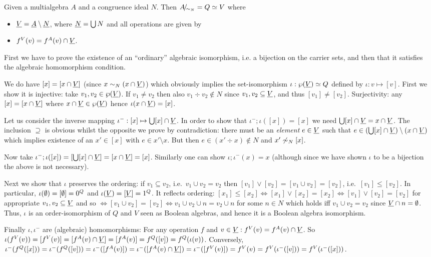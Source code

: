 \documentclass[10pt]{article}
\begin{document}
\begin{Fact}
Given a multialgebra $A$ and a congruence ideal $N$. 
Then $A\!{\textstyle /}\!_{{\sim_{N}}}=Q\mathrel{\simeq} V$ where 
%
\begin{itemize}\MyLPar
\item 
$\underline {V}=\underline {A}\setminus\underline {N}$, where $\underline {N}=\bigcup N$
and all operations are given by
\item 
$f^V(v)=f^A(v)\cap\underline {V}$.
\end{itemize}
\end{Fact}

\begin{Proof}
First we have to prove the existence of an ``ordinary''
algebraic isomorphism, i.e. a bijection on the carrier sets, and then that
it satisfies the algebraic homomorphism condition.

We do have $[x]=[x\cap\underline {V}]$ (since $x\sim_N (x\cap\underline {V})$)
which obviously implies the set-isomorphism $\iota: \wp(\underline {V})
\mathrel{\simeq} Q$ defined by $\iota:v\mapsto [v]$. First we show it is
injective: take $v_1,v_2\in\wp(\underline {V})$. If $v_1\not= v_2$ then
also $v_1\div v_2\not\in N$ since $v_1,v_2\subseteq\underline {V}$, and thus
$[v_1]\not=[v_2]$. Surjectivity: any $[x] = [x\cap \underline {V}]$ where
$x\cap\underline {V} \in \wp(\underline {V})$ hence $\iota(x\cap\underline {V}) = [x]$.

Let us consider the inverse mapping $\iota^- : [x] \mapsto \bigcup [x]
\cap \underline {V}$. In order to show that $\iota^-;\iota([x]) = [x]$ we
need $\bigcup [x]\cap\underline {V} = x\cap\underline {V}$. The inclusion $\supseteq$
 is obvious whilst the opposite we prove by contradiction: there
must be an {\em element\/} $e \in \underline {V}$ such that $e \in (\bigcup
[x]\cap\underline {V}) \setminus (x\cap\underline {V})$ which implies existence of an $x'
\in [x]$ with $e \in x'\setminus x$. But then $e \in (x'\div x) \not\in N$ and
$x' \not\sim_N [x]$. 

Now take $\iota^-;\iota([x]) = [\bigcup [x]\cap \underline {V}] =
[x\cap\underline {V}] = [x]$. Similarly one can show $\iota;\iota^-(x)=x$
(although since we have shown $\iota$ to be a bijection the above is
not necessary).

Next we show that $\iota$ preserves the ordering: if $v_1\subseteq
v_2$, i.e.\ $v_1\cup v_2 = v_2$ then $[v_1]\vee [v_2]= [v_1\cup
v_2]=[v_2]$, i.e.\ $[v_1]\leq [v_2]$. In particular,
$\iota(\emptyset)=[\emptyset]=0^Q$ and $\iota(\underline {V})=[\underline {V}]=1^Q$.  It
reflects ordering: $[x_1]\leq [x_2]\iff [x_1]\vee [x_2]=[x_2]\iff
[v_1]\vee[v_2]=[v_2]$ for appropriate $v_1,v_2\subseteq\underline {V}$ and
so $\iff [v_1\cup v_2]=[v_2]\iff v_1\cup v_2\cup n = v_2\cup n$ for
some $n\in N$ which holds iff $v_1\cup v_2=v_2$ since $\underline {V}\cap
n=\emptyset$.  Thus, $\iota$ is an order-isomorphism of $Q$ and $V$ seen as
Boolean algebras, and hence it is a Boolean algebra isomorphism.

Finally $\iota, \iota^-$ are (algebraic) homomorphisms: For any
operation $f$ and $v\in\underline {V}: f^V(v)=f^A(v)\cap \underline {V}$.  So
$\iota(f^V(v))=[f^V(v)]=[f^A(v)\cap\underline {V}]=
[f^A(v)]=f^Q([v])=f^Q(\iota(v))$.  Conversely,
$\iota^-(f^Q([x]))=\iota^-(f^Q([v]))= \iota^-([f^A(v)])=
\iota^-([f^A(v)\cap\underline {V}]) = \iota^-([f^V(v)])=
f^V(v)=f^V(\iota^-([v])) = f^V(\iota^-([x]))$.
\end{Proof}
\end{document}
